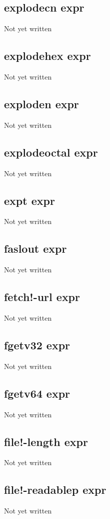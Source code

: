 \documentclass[a4paper,11pt]{article}
\begin{document}
{\subsection{\ttfamily explodecn expr}
Not yet written

\subsection{\ttfamily explodehex expr}
Not yet written

\subsection{\ttfamily exploden expr}
Not yet written

\subsection{\ttfamily explodeoctal expr}
Not yet written

\subsection{\ttfamily expt expr}
Not yet written

\subsection{\ttfamily faslout expr}
Not yet written

\subsection{\ttfamily fetch!-url expr}
Not yet written

\subsection{\ttfamily fgetv32 expr}
Not yet written

\subsection{\ttfamily fgetv64 expr}
Not yet written

\subsection{\ttfamily file!-length expr}
Not yet written

\subsection{\ttfamily file!-readablep expr}
Not yet written

}
\end{document}

